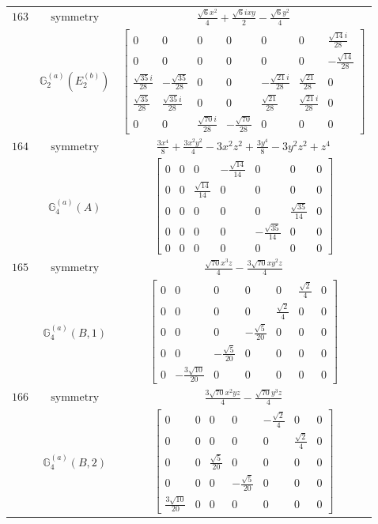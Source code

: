 \documentclass[fleqn,8pt,landscape]{jsarticle}
\begin{document}
\begin{longtable}{ccc}
$ 163 $ & $ \text{symmetry} $ & $ \frac{\sqrt{6} x^{2}}{4} + \frac{\sqrt{6} i x y}{2} - \frac{\sqrt{6} y^{2}}{4} $ \\
$  $ & $ \mathbb{G}_{2}^{(a)}(E_{2}^{(b)}) $ & $ \begin{bmatrix} 0 & 0 & 0 & 0 & 0 & 0 & \frac{\sqrt{14} i}{28} \\ 0 & 0 & 0 & 0 & 0 & 0 & - \frac{\sqrt{14}}{28} \\ \frac{\sqrt{35} i}{28} & - \frac{\sqrt{35}}{28} & 0 & 0 & - \frac{\sqrt{21} i}{28} & \frac{\sqrt{21}}{28} & 0 \\ \frac{\sqrt{35}}{28} & \frac{\sqrt{35} i}{28} & 0 & 0 & \frac{\sqrt{21}}{28} & \frac{\sqrt{21} i}{28} & 0 \\ 0 & 0 & \frac{\sqrt{70} i}{28} & - \frac{\sqrt{70}}{28} & 0 & 0 & 0 \end{bmatrix} $ \\ \hline
$ 164 $ & $ \text{symmetry} $ & $ \frac{3 x^{4}}{8} + \frac{3 x^{2} y^{2}}{4} - 3 x^{2} z^{2} + \frac{3 y^{4}}{8} - 3 y^{2} z^{2} + z^{4} $ \\
$  $ & $ \mathbb{G}_{4}^{(a)}(A) $ & $ \begin{bmatrix} 0 & 0 & 0 & - \frac{\sqrt{14}}{14} & 0 & 0 & 0 \\ 0 & 0 & \frac{\sqrt{14}}{14} & 0 & 0 & 0 & 0 \\ 0 & 0 & 0 & 0 & 0 & \frac{\sqrt{35}}{14} & 0 \\ 0 & 0 & 0 & 0 & - \frac{\sqrt{35}}{14} & 0 & 0 \\ 0 & 0 & 0 & 0 & 0 & 0 & 0 \end{bmatrix} $ \\ \hline
$ 165 $ & $ \text{symmetry} $ & $ \frac{\sqrt{70} x^{3} z}{4} - \frac{3 \sqrt{70} x y^{2} z}{4} $ \\
$  $ & $ \mathbb{G}_{4}^{(a)}(B,1) $ & $ \begin{bmatrix} 0 & 0 & 0 & 0 & 0 & \frac{\sqrt{2}}{4} & 0 \\ 0 & 0 & 0 & 0 & \frac{\sqrt{2}}{4} & 0 & 0 \\ 0 & 0 & 0 & - \frac{\sqrt{5}}{20} & 0 & 0 & 0 \\ 0 & 0 & - \frac{\sqrt{5}}{20} & 0 & 0 & 0 & 0 \\ 0 & - \frac{3 \sqrt{10}}{20} & 0 & 0 & 0 & 0 & 0 \end{bmatrix} $ \\ \hline
$ 166 $ & $ \text{symmetry} $ & $ \frac{3 \sqrt{70} x^{2} y z}{4} - \frac{\sqrt{70} y^{3} z}{4} $ \\
$  $ & $ \mathbb{G}_{4}^{(a)}(B,2) $ & $ \begin{bmatrix} 0 & 0 & 0 & 0 & - \frac{\sqrt{2}}{4} & 0 & 0 \\ 0 & 0 & 0 & 0 & 0 & \frac{\sqrt{2}}{4} & 0 \\ 0 & 0 & \frac{\sqrt{5}}{20} & 0 & 0 & 0 & 0 \\ 0 & 0 & 0 & - \frac{\sqrt{5}}{20} & 0 & 0 & 0 \\ \frac{3 \sqrt{10}}{20} & 0 & 0 & 0 & 0 & 0 & 0 \end{bmatrix} $ \\ \hline

\end{longtable}
\end{document}
